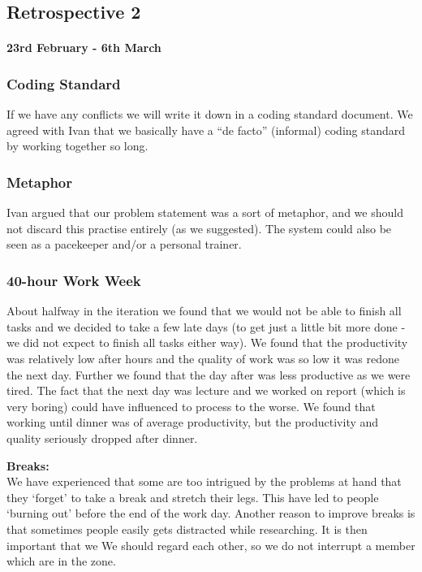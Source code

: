 \subsection*{Retrospective 2}
\paragraph{23rd February - 6th March}

\subsubsection{Coding Standard}
If we have any conflicts we will write it down in a coding standard document. We agreed with Ivan that we basically have a ``de facto'' (informal) coding standard by working together so long.

\subsubsection{Metaphor}
Ivan argued that our problem statement was a sort of metaphor, and we should not discard this practise entirely (as we suggested).
The system could also be seen as a pacekeeper and/or a personal trainer.

\subsubsection{40-hour Work Week}
About halfway in the iteration we found that we would not be able to finish all tasks and we decided to take a few late days (to get just a little bit more done - we did not expect to finish all tasks either way).
We found that the productivity was relatively low after hours and the quality of work was so low it was redone the next day. Further we found that the day after was less productive as we were tired. The fact that the next day was lecture and we worked on report (which is very boring) could have influenced to process to the worse.
We found that working until dinner was of average productivity, but the productivity and quality seriously dropped after dinner.

\textbf{Breaks:}\\
We have experienced that some are too intrigued by the problems at hand that they ‘forget' to take a break and stretch their legs. This have led to people ‘burning out' before the end of the work day.
Another reason to improve breaks is that sometimes people easily gets distracted while researching. It is then important that we 
We should regard each other, so we do not interrupt a member which are in the zone.

